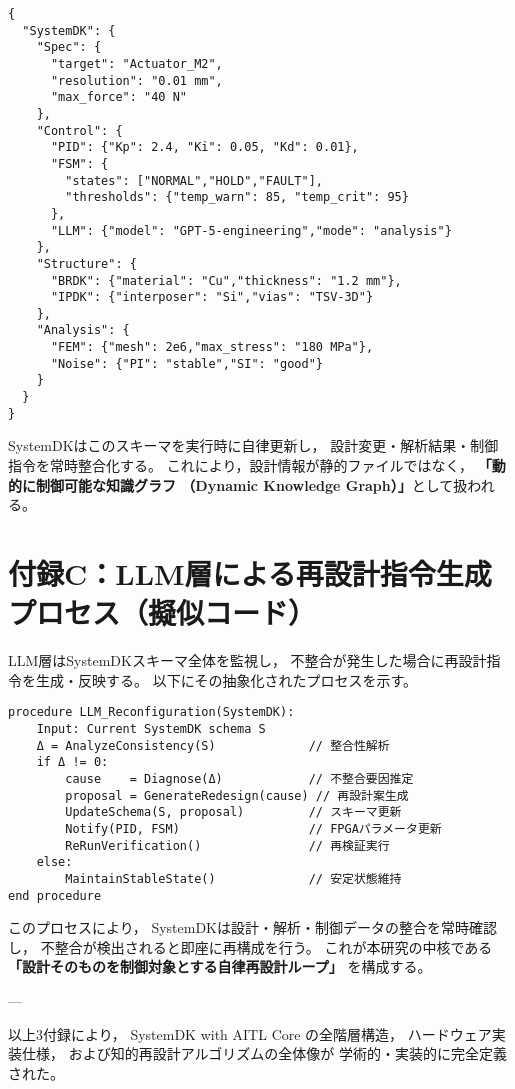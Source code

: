 \begin{lstlisting}[caption={SystemDKスキーマ例},label={lst:sdk_schema}]
{
  "SystemDK": {
    "Spec": {
      "target": "Actuator_M2",
      "resolution": "0.01 mm",
      "max_force": "40 N"
    },
    "Control": {
      "PID": {"Kp": 2.4, "Ki": 0.05, "Kd": 0.01},
      "FSM": {
        "states": ["NORMAL","HOLD","FAULT"],
        "thresholds": {"temp_warn": 85, "temp_crit": 95}
      },
      "LLM": {"model": "GPT-5-engineering","mode": "analysis"}
    },
    "Structure": {
      "BRDK": {"material": "Cu","thickness": "1.2 mm"},
      "IPDK": {"interposer": "Si","vias": "TSV-3D"}
    },
    "Analysis": {
      "FEM": {"mesh": 2e6,"max_stress": "180 MPa"},
      "Noise": {"PI": "stable","SI": "good"}
    }
  }
}
\end{lstlisting}

SystemDKはこのスキーマを実行時に自律更新し，
設計変更・解析結果・制御指令を常時整合化する。
これにより，設計情報が静的ファイルではなく，
\textbf{「動的に制御可能な知識グラフ
（Dynamic Knowledge Graph）」}として扱われる。

\section*{付録C：LLM層による再設計指令生成プロセス（擬似コード）}

LLM層はSystemDKスキーマ全体を監視し，
不整合が発生した場合に再設計指令を生成・反映する。
以下にその抽象化されたプロセスを示す。

\begin{lstlisting}[caption={LLM層の再設計指令生成プロセス},label={lst:llm_proc}]
procedure LLM_Reconfiguration(SystemDK):
    Input: Current SystemDK schema S
    Δ = AnalyzeConsistency(S)             // 整合性解析
    if Δ != 0:
        cause    = Diagnose(Δ)            // 不整合要因推定
        proposal = GenerateRedesign(cause) // 再設計案生成
        UpdateSchema(S, proposal)         // スキーマ更新
        Notify(PID, FSM)                  // FPGAパラメータ更新
        ReRunVerification()               // 再検証実行
    else:
        MaintainStableState()             // 安定状態維持
end procedure
\end{lstlisting}

このプロセスにより，
SystemDKは設計・解析・制御データの整合を常時確認し，
不整合が検出されると即座に再構成を行う。
これが本研究の中核である
\textbf{「設計そのものを制御対象とする自律再設計ループ」}
を構成する。

---

\noindent
以上3付録により，
SystemDK with AITL Core の全階層構造，
ハードウェア実装仕様，
および知的再設計アルゴリズムの全体像が
学術的・実装的に完全定義された。
